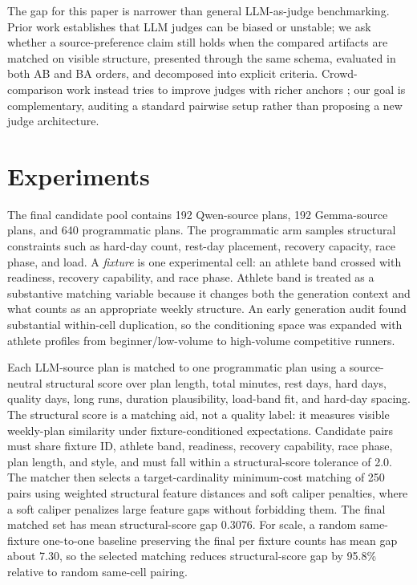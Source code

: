 \documentclass[11pt]{article}
\begin{document}
The gap for this paper is narrower than general LLM-as-judge benchmarking. Prior work establishes that LLM judges can be biased or unstable; we ask whether a source-preference claim still holds when the compared artifacts are matched on visible structure, presented through the same schema, evaluated in both AB and BA orders, and decomposed into explicit criteria. Crowd-comparison work instead tries to improve judges with richer anchors \citep{zhang2025crowd}; our goal is complementary, auditing a standard pairwise setup rather than proposing a new judge architecture.

\section{Experiments}

The final candidate pool contains 192 Qwen-source plans, 192 Gemma-source plans, and 640 programmatic plans. The programmatic arm samples structural constraints such as hard-day count, rest-day placement, recovery capacity, race phase, and load. A \emph{fixture} is one experimental cell: an athlete band crossed with readiness, recovery capability, and race phase. Athlete band is treated as a substantive matching variable because it changes both the generation context and what counts as an appropriate weekly structure. An early generation audit found substantial within-cell duplication, so the conditioning space was expanded with athlete profiles from beginner/low-volume to high-volume competitive runners.

Each LLM-source plan is matched to one programmatic plan using a source-neutral structural score over plan length, total minutes, rest days, hard days, quality days, long runs, duration plausibility, load-band fit, and hard-day spacing. The structural score is a matching aid, not a quality label: it measures visible weekly-plan similarity under fixture-conditioned expectations. Candidate pairs must share fixture ID, athlete band, readiness, recovery capability, race phase, plan length, and style, and must fall within a structural-score tolerance of 2.0. The matcher then selects a target-cardinality minimum-cost matching of 250 pairs using weighted structural feature distances and soft caliper penalties, where a soft caliper penalizes large feature gaps without forbidding them. The final matched set has mean structural-score gap 0.3076. For scale, a random same-fixture one-to-one baseline preserving the final per fixture counts has mean gap about 7.30, so the selected matching reduces structural-score gap by 95.8\% relative to random same-cell pairing.
\end{document}
